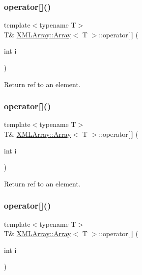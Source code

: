 \subsubsection{\texorpdfstring{operator[]()}{operator[]()}\hspace{0.1cm}{\footnotesize\ttfamily [1/6]}}
{\footnotesize\ttfamily template$<$typename T$>$ \\
T\& \mbox{\hyperlink{classXMLArray_1_1Array}{X\+M\+L\+Array\+::\+Array}}$<$ T $>$\+::operator\mbox{[}$\,$\mbox{]} (\begin{DoxyParamCaption}\item[{int}]{i }\end{DoxyParamCaption})\hspace{0.3cm}{\ttfamily [inline]}}



Return ref to an element. 

\mbox{\label{classXMLArray_1_1Array_a42dbfab67d875b6fa456cade78f70f8f}} 
\subsubsection{\texorpdfstring{operator[]()}{operator[]()}\hspace{0.1cm}{\footnotesize\ttfamily [2/6]}}
{\footnotesize\ttfamily template$<$typename T$>$ \\
T\& \mbox{\hyperlink{classXMLArray_1_1Array}{X\+M\+L\+Array\+::\+Array}}$<$ T $>$\+::operator\mbox{[}$\,$\mbox{]} (\begin{DoxyParamCaption}\item[{int}]{i }\end{DoxyParamCaption})\hspace{0.3cm}{\ttfamily [inline]}}



Return ref to an element. 

\mbox{\label{classXMLArray_1_1Array_a42dbfab67d875b6fa456cade78f70f8f}} 
\subsubsection{\texorpdfstring{operator[]()}{operator[]()}\hspace{0.1cm}{\footnotesize\ttfamily [3/6]}}
{\footnotesize\ttfamily template$<$typename T$>$ \\
T\& \mbox{\hyperlink{classXMLArray_1_1Array}{X\+M\+L\+Array\+::\+Array}}$<$ T $>$\+::operator\mbox{[}$\,$\mbox{]} (\begin{DoxyParamCaption}\item[{int}]{i }\end{DoxyParamCaption})\hspace{0.3cm}{\ttfamily [inline]}}



